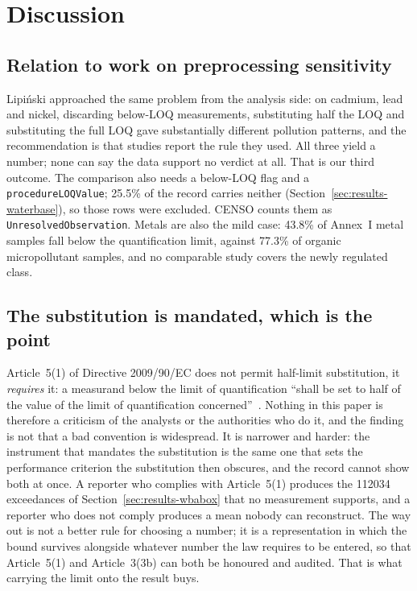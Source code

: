 \section{Discussion}

\subsection{Relation to work on preprocessing sensitivity}
\label{sec:disc-lipinski}
Lipi\'nski \cite{lipinski2026sensitivity} approached the same problem from the
analysis side: on cadmium, lead and nickel, discarding below-LOQ measurements,
substituting half the LOQ and substituting the full LOQ gave substantially
different pollution patterns, and the recommendation is that studies report the
rule they used. All three yield a number; none can say the data support no
verdict at all. That is our third outcome. The comparison also needs a below-LOQ
flag and a \texttt{procedureLOQValue}; \num{25.5}\% of the record carries neither
(Section~\ref{sec:results-waterbase}), so those rows were excluded. CENSO
counts them as \texttt{UnresolvedObservation}. Metals are also the mild case:
\num{43.8}\% of Annex~I metal samples fall below the quantification limit,
against \num{77.3}\% of organic micropollutant
samples, and no comparable study covers
the newly regulated class.

\subsection{The substitution is mandated, which is the point}
\label{sec:disc-mandated}
Article~5(1) of Directive 2009/90/EC does not permit half-limit substitution, it
\emph{requires} it: a measurand below the limit of quantification ``shall be set
to half of the value of the limit of quantification
concerned''~\cite{eu2009qaqc}. Nothing in this paper is therefore a criticism of
the analysts or the authorities who do it, and the finding is not that a bad
convention is widespread. It is narrower and harder: the instrument that mandates
the substitution is the same one that sets the performance criterion the
substitution then obscures, and the record cannot show both at once. A reporter
who complies with Article~5(1) produces the \num{112034} exceedances of
Section~\ref{sec:results-wbabox} that no measurement supports, and a reporter
who does not comply produces a mean nobody can reconstruct. The way out is not a
better rule for choosing a number; it is a representation in which the bound
survives alongside whatever number the law requires to be entered, so that
Article~5(1) and Article~3(3b) can both be honoured and audited. That is what
carrying the limit onto the result buys.

